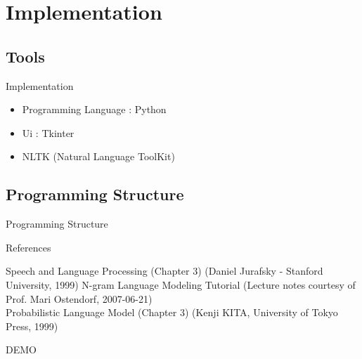 \documentclass{beamer}
\begin{document}
\section{Implementation}

\subsection{Tools}
\begin{frame}{Implementation}
    \begin{itemize}
        \item Programming Language : Python
        \item Ui : Tkinter
        \item NLTK (Natural Language ToolKit)
    \end{itemize}
\end{frame}

\subsection{Programming Structure}
\begin{frame}{Programming Structure}
    \smartdiagramset{}
    \begin{center}
    \end{center}
\end{frame}


\begin{frame}{References}
    \begin{thebibliography}{4}
            Speech and Language Processing (Chapter 3) (Daniel Jurafsky - Stanford University, 1999)
            N-gram Language Modeling Tutorial (Lecture notes courtesy of Prof. Mari Ostendorf, 2007-06-21)\\
            Probabilistic Language Model (Chapter 3) (Kenji KITA, University of Tokyo Press, 1999)
    \end{thebibliography}
\end{frame}
\begin{frame}
    \centering
    \Huge DEMO
\end{frame}

\end{document}
